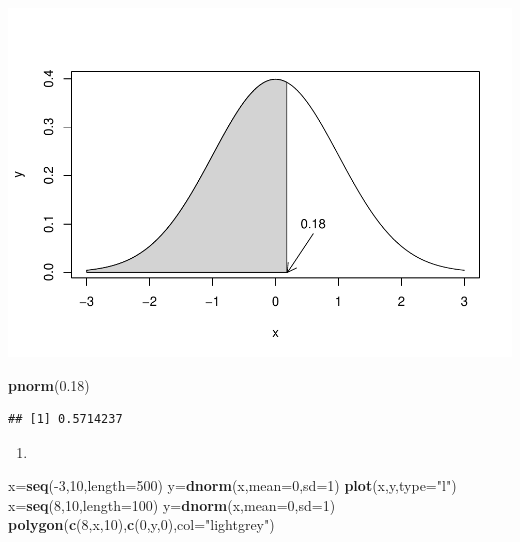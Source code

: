 \documentclass[]{article}
\newenvironment{Shaded}{\begin{snugshade}}{\end{snugshade}}
\newcommand{\KeywordTok}[1]{\textcolor[rgb]{0.13,0.29,0.53}{\textbf{{#1}}}}
\newcommand{\DataTypeTok}[1]{\textcolor[rgb]{0.13,0.29,0.53}{{#1}}}
\newcommand{\DecValTok}[1]{\textcolor[rgb]{0.00,0.00,0.81}{{#1}}}
\newcommand{\FloatTok}[1]{\textcolor[rgb]{0.00,0.00,0.81}{{#1}}}
\newcommand{\StringTok}[1]{\textcolor[rgb]{0.31,0.60,0.02}{{#1}}}
\newcommand{\NormalTok}[1]{{#1}}
\begin{document}
\includegraphics{DATA_606_-_Homework_3_files/figure-latex/unnamed-chunk-2-1.pdf}

\begin{Shaded}
\begin{Highlighting}[]
\KeywordTok{pnorm}\NormalTok{(}\FloatTok{0.18}\NormalTok{)}
\end{Highlighting}
\end{Shaded}

\begin{verbatim}
## [1] 0.5714237
\end{verbatim}

\begin{enumerate}
\def\labelenumi{(\alph{enumi})}
\setcounter{enumi}{2}
\item
\end{enumerate}

\begin{Shaded}
\begin{Highlighting}[]
\NormalTok{x=}\KeywordTok{seq}\NormalTok{(-}\DecValTok{3}\NormalTok{,}\DecValTok{10}\NormalTok{,}\DataTypeTok{length=}\DecValTok{500}\NormalTok{)}
\NormalTok{y=}\KeywordTok{dnorm}\NormalTok{(x,}\DataTypeTok{mean=}\DecValTok{0}\NormalTok{,}\DataTypeTok{sd=}\DecValTok{1}\NormalTok{)}
\KeywordTok{plot}\NormalTok{(x,y,}\DataTypeTok{type=}\StringTok{"l"}\NormalTok{)}
\NormalTok{x=}\KeywordTok{seq}\NormalTok{(}\DecValTok{8}\NormalTok{,}\DecValTok{10}\NormalTok{,}\DataTypeTok{length=}\DecValTok{100}\NormalTok{)}
\NormalTok{y=}\KeywordTok{dnorm}\NormalTok{(x,}\DataTypeTok{mean=}\DecValTok{0}\NormalTok{,}\DataTypeTok{sd=}\DecValTok{1}\NormalTok{)}
\KeywordTok{polygon}\NormalTok{(}\KeywordTok{c}\NormalTok{(}\DecValTok{8}\NormalTok{,x,}\DecValTok{10}\NormalTok{),}\KeywordTok{c}\NormalTok{(}\DecValTok{0}\NormalTok{,y,}\DecValTok{0}\NormalTok{),}\DataTypeTok{col=}\StringTok{"lightgrey"}\NormalTok{)}
\end{Highlighting}
\end{Shaded}
\end{document}

